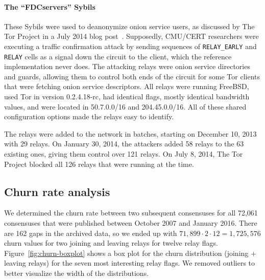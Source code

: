 \paragraph{The ``FDCservers'' Sybils}
These Sybils were used to deanonymize onion service users, as discussed by The
Tor Project in a July 2014 blog post~\cite{cmucert}.  Supposedly, CMU/CERT
researchers were executing a traffic confirmation attack by sending sequences of
\texttt{RELAY\_EARLY} and \texttt{RELAY} cells as a signal down the circuit to
the client, which the reference implementation never does.  The attacking relays
were onion service directories and guards, allowing them to control both ends of
the circuit for some Tor clients that were fetching onion service descriptors.
All relays were running FreeBSD, used Tor in version 0.2.4.18-rc, had identical
flags, mostly identical bandwidth values, and were located in 50.7.0.0/16 and
204.45.0.0/16.  All of these shared configuration options made the relays easy
to identify.

The relays were added to the network in batches, starting on December 10, 2013
with 29 relays.  On January 30, 2014, the attackers added 58 relays to the 63
existing ones, giving them control over 121 relays.  On July 8, 2014, The Tor
Project blocked all 126 relays that were running at the time.

% 

\subsection{Churn rate analysis}
\label{sec:churn}
We determined the churn rate between two subsequent consensuses for all 72,061
consensuses that were published between October 2007 and January 2016.  There
are 162 gaps in the archived data, so we ended up with $71,899 \cdot 2 \cdot 12
= 1,725,576$ churn values for two joining and leaving relays for twelve relay
flags.  Figure~\ref{fig:churn-boxplot} shows a box plot for the churn
distribution (joining $+$ leaving relays) for the seven most interesting relay
flags.  We removed outliers to better visualize the width of the distributions.

